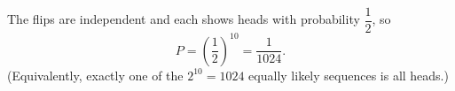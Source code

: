The flips are independent and each shows heads with probability $\dfrac{1}{2}$, so
\[
P=\left(\dfrac{1}{2}\right)^{10}=\boxed{\dfrac{1}{1024}}.
\]
(Equivalently, exactly one of the $2^{10}=1024$ equally likely sequences is all heads.)
